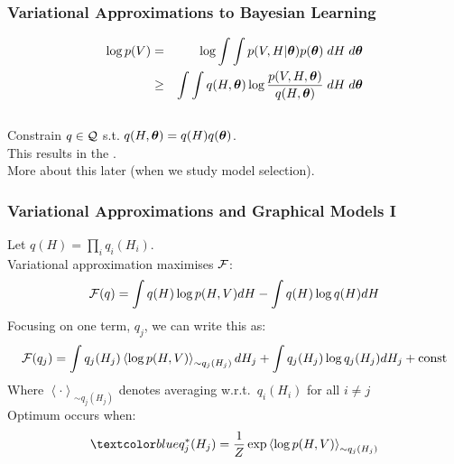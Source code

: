 \begin{frame}
\frametitle{Variational Approximations to Bayesian Learning}

\begin{eqnarray*}
\log p(V) &=& \log \int \int p(V,H|\boldsymbol{\theta}) p(\boldsymbol{\theta}) \; dH \; d\boldsymbol{\theta} \\
&\ge & \int \int q(H,\boldsymbol{\theta}) \log \frac{p(V,H,\boldsymbol{\theta})}{q(H,\boldsymbol{\theta})}
\; dH \; d\boldsymbol{\theta} 
\end{eqnarray*} \\[1ex]

Constrain $q \in {\cal Q}$ s.t. $q(H,\boldsymbol{\theta}) = q(H) q(\boldsymbol{\theta})$. \\[2ex]

This results in the . \\[2ex]

More about this later (when we study model selection).

\end{frame}
\begin{frame}
\frametitle{Variational Approximations and Graphical Models I}

Let $q(H) = \prod_i q_i(H_i)$. \\[2ex]

Variational approximation maximises $\cal F$:
\[
{\cal F}(q) = \int q(H) \log p(H,V) dH - \int q(H) \log q(H) dH
\]
Focusing on one term, $q_j$, we can write this as:
\[
{\cal F}(q_j) = \int q_j(H_j) \left\langle \log p(H,V)
\right\rangle_{\sim q_j(H_j)} dH_j + \int q_j(H_j) \log q_j(H_j) dH_j+
\mbox{const} 
\]
Where $\left\langle \cdot \right\rangle_{\sim q_j(H_j)}$ denotes
averaging w.r.t.\ $q_i(H_i)$ for all $i \neq j$ \\[2ex]

Optimum  occurs when: 
\[
\Blue{q^*_j(H_j) = \frac{1}{Z} \exp \left\langle \log p(H,V)
\right\rangle_{\sim q_j(H_j)}}
\]

\end{frame}
